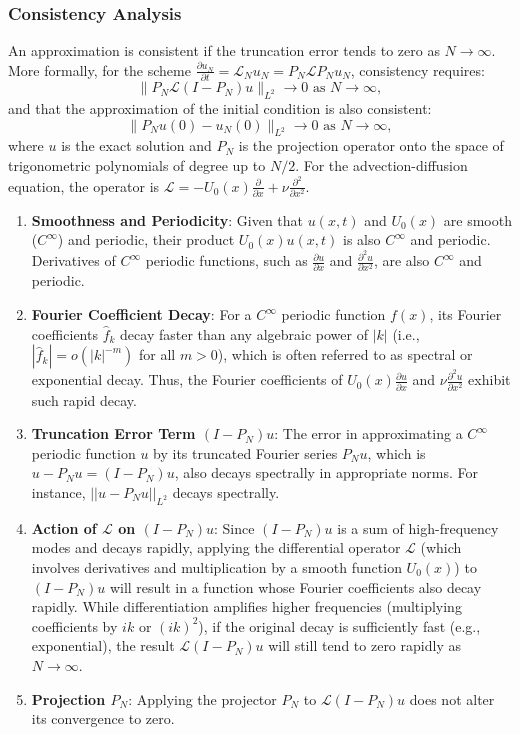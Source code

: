 \subsubsection{Consistency Analysis}
An approximation is consistent if the truncation error tends to zero as $N \rightarrow \infty$. More formally, for the scheme $\frac{\partial u_N}{\partial t} = \mathcal{L}_N u_N = P_N \mathcal{L} P_N u_N$, consistency requires:
\begin{equation}
\|P_N \mathcal{L}(I - P_N)u\|_{L^2} \rightarrow 0 \text{ as } N \rightarrow \infty,
\label{eq:consistency_cond1}
\end{equation}
and that the approximation of the initial condition is also consistent:
\begin{equation}
\|P_N u(0) - u_N(0)\|_{L^2} \rightarrow 0 \text{ as } N \rightarrow \infty,
\label{eq:consistency_cond2}
\end{equation}
where $u$ is the exact solution and $P_N$ is the projection operator onto the space of trigonometric polynomials of degree up to $N/2$.
For the advection-diffusion equation, the operator is $\mathcal{L} = -U_0(x)\frac{\partial}{\partial x} + \nu\frac{\partial^2}{\partial x^2}$.
\begin{enumerate}
    \item \textbf{Smoothness and Periodicity}: Given that $u(x,t)$ and $U_0(x)$ are smooth ($C^\infty$) and periodic, their product $U_0(x)u(x,t)$ is also $C^\infty$ and periodic. Derivatives of $C^\infty$ periodic functions, such as $\frac{\partial u}{\partial x}$ and $\frac{\partial^2 u}{\partial x^2}$, are also $C^\infty$ and periodic.
    \item \textbf{Fourier Coefficient Decay}: For a $C^\infty$ periodic function $f(x)$, its Fourier coefficients $\hat{f}_k$ decay faster than any algebraic power of $|k|$ (i.e., $|\hat{f}_k| = o(|k|^{-m})$ for all $m > 0$), which is often referred to as spectral or exponential decay. Thus, the Fourier coefficients of $U_0(x)\frac{\partial u}{\partial x}$ and $\nu\frac{\partial^2 u}{\partial x^2}$ exhibit such rapid decay.
    \item \textbf{Truncation Error Term $(I-P_N)u$}: The error in approximating a $C^\infty$ periodic function $u$ by its truncated Fourier series $P_N u$, which is $u - P_N u = (I-P_N)u$, also decays spectrally in appropriate norms. For instance, $||u - P_N u||_{L^2}$ decays spectrally.
    \item \textbf{Action of $\mathcal{L}$ on $(I-P_N)u$}: Since $(I-P_N)u$ is a sum of high-frequency modes and decays rapidly, applying the differential operator $\mathcal{L}$ (which involves derivatives and multiplication by a smooth function $U_0(x)$) to $(I-P_N)u$ will result in a function whose Fourier coefficients also decay rapidly. While differentiation amplifies higher frequencies (multiplying coefficients by $ik$ or $(ik)^2$), if the original decay is sufficiently fast (e.g., exponential), the result $\mathcal{L}(I-P_N)u$ will still tend to zero rapidly as $N \rightarrow \infty$.
    \item \textbf{Projection $P_N$}: Applying the projector $P_N$ to $\mathcal{L}(I-P_N)u$ does not alter its convergence to zero.
\end{enumerate}
